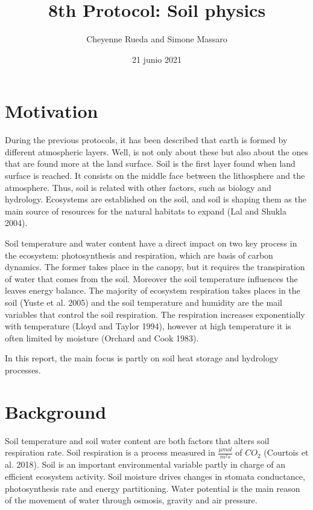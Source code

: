 \documentclass[
]{article}
\title{8th Protocol: Soil physics}
\author{Cheyenne Rueda and Simone Massaro}
\date{21 junio 2021}
\begin{document}
\maketitle

{
\setcounter{tocdepth}{2}
\tableofcontents
}
\newpage

\hypertarget{motivation}{%
\section{Motivation}\label{motivation}}

During the previous protocols, it has been described that earth is formed by different atmospheric layers.
Well, is not only about these but also about the ones that are found more at the land surface.
Soil is the first layer found when land surface is reached.
It consists on the middle face between the lithosphere and the atmosphere.
Thus, soil is related with other factors, such as biology and hydrology.
Ecosystems are established on the soil, and soil is shaping them as the main source of resources for the natural habitats to expand (Lal and Shukla 2004).

Soil temperature and water content have a direct impact on two key process in the ecosystem: photosynthesis and respiration, which are basis of carbon dynamics. The former takes place in the canopy, but it requires the transpiration of water that comes from the soil. Moreover the soil temperature influences the leaves energy balance.
The majority of ecosystem respiration takes places in the soil (Yuste et al. 2005) and the soil temperature and humidity are the mail variables that control the soil respiration.
The respiration increases exponentially with temperature (Lloyd and Taylor 1994),
however at high temperature it is often limited by moisture (Orchard and Cook 1983).

In this report, the main focus is partly on soil heat storage and hydrology processes.

\hypertarget{background}{%
\section{Background}\label{background}}

Soil temperature and soil water content are both factors that alters soil respiration rate. Soil respiration is a process measured in \(\frac{\mu mol} {m^2 s}\) of \(CO_2\) (Courtois et al. 2018).
Soil is an important environmental variable partly in charge of an efficient ecosystem activity.
Soil moisture drives changes in stomata conductance, photosynthesis rate and energy partitioning. Water potential is the main reason of the movement of water through osmosis, gravity and air pressure.
\end{document}
